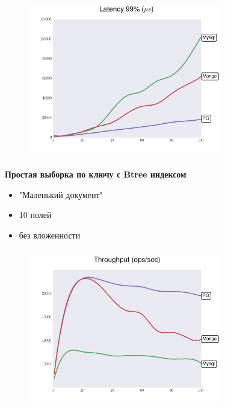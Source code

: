 \documentclass[18pt, compress, aspectratio=169]{beamer}
\begin{document}
\begin{frame}
    \frametitle{}
    \begin{center}
    \begin{figure}
        \includegraphics[width=0.75\textwidth,center]{benchmarks/workload_c_jsonb_path_ops/latency_99.png}
    \end{figure}
    \end{center}
\end{frame}

\begin{frame}
    \frametitle{}
    \begin{center}
        \textbf{Простая выборка по ключу с Btree индексом}
        \begin{itemize}[label={}]
            \item "Маленький документ"
            \item 10 полей
            \item без вложенности
        \end{itemize}
    \end{center}
\end{frame}

\begin{frame}
    \frametitle{}
    \begin{center}
    \begin{figure}
        \includegraphics[width=0.75\textwidth,center]{benchmarks/workload_c_btree/throughput.png}
    \end{figure}
    \end{center}
\end{frame}
\end{document}
